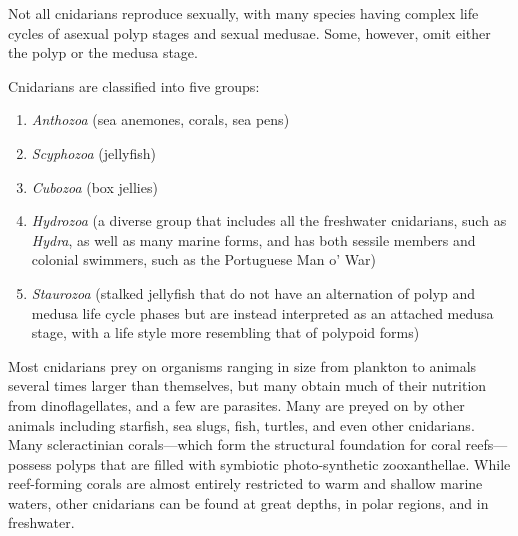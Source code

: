 \documentclass[]{book}
\providecommand{\tightlist}{%
  \setlength{\itemsep}{0pt}\setlength{\parskip}{0pt}}
\theoremstyle{definition}
\theoremstyle{definition}
\theoremstyle{definition}
\theoremstyle{remark}
\begin{document}
Not all cnidarians reproduce sexually, with many species having complex
life cycles of asexual polyp stages and sexual medusae. Some, however,
omit either the polyp or the medusa stage.

Cnidarians are classified into five groups:

\begin{enumerate}
\def\labelenumi{\arabic{enumi}.}
\tightlist
\item
  \emph{Anthozoa} (sea anemones, corals, sea pens)
\item
  \emph{Scyphozoa} (jellyfish)
\item
  \emph{Cubozoa} (box jellies)
\item
  \emph{Hydrozoa} (a diverse group that includes all the freshwater
  cnidarians, such as \emph{Hydra}, as well as many marine forms, and
  has both sessile members and colonial swimmers, such as the Portuguese
  Man o' War)
\item
  \emph{Staurozoa} (stalked jellyfish that do not have an alternation of
  polyp and medusa life cycle phases but are instead interpreted as an
  attached medusa stage, with a life style more resembling that of
  polypoid forms)
\end{enumerate}

Most cnidarians prey on organisms ranging in size from plankton to
animals several times larger than themselves, but many obtain much of
their nutrition from dinoflagellates, and a few are parasites. Many are
preyed on by other animals including starfish, sea slugs, fish, turtles,
and even other cnidarians. Many scleractinian corals---which form the
structural foundation for coral reefs---possess polyps that are filled
with symbiotic photo-synthetic zooxanthellae. While reef-forming corals
are almost entirely restricted to warm and shallow marine waters, other
cnidarians can be found at great depths, in polar regions, and in
freshwater.
\end{document}
